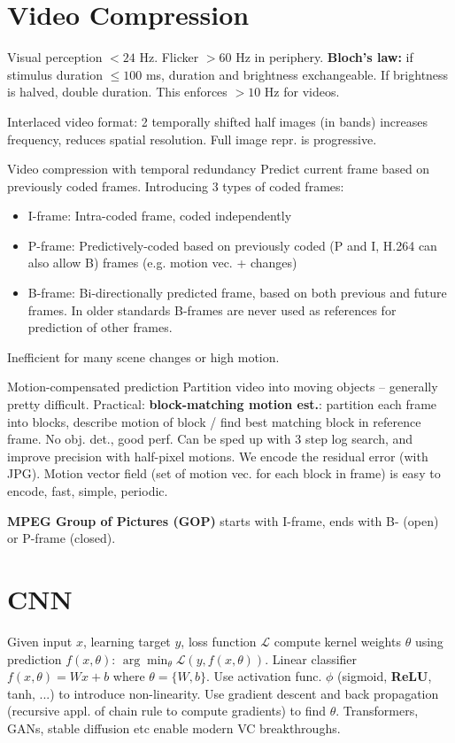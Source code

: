 \documentclass[a4paper,9pt]{article}
\begin{document}
\section{Video Compression}
Visual perception $<24$ Hz. Flicker $>60$ Hz in periphery. \textbf{Bloch's law:} if stimulus duration $\le 100$ ms, duration and brightness exchangeable. If brightness is halved, double duration. This enforces $>10$ Hz for videos.

Interlaced video format: 2 temporally shifted half images (in bands) increases frequency, reduces spatial resolution. Full image repr. is progressive.

\begin{subbox}{Video compression with temporal redundancy}
Predict current frame based on previously coded frames. Introducing 3 types of coded frames:
\begin{itemize}
  \item I-frame: Intra-coded frame, coded independently
  \item P-frame: Predictively-coded based on previously coded (P and I, H.264 can also allow B) frames (e.g. motion vec. + changes)
  \item B-frame: Bi-directionally predicted frame, based on both previous and future frames. In older standards B-frames are never used as references for prediction of other frames.
\end{itemize}
\end{subbox}
Inefficient for many scene changes or high motion.

\begin{subbox}{Motion-compensated prediction}
Partition video into moving objects -- generally pretty difficult. Practical: \textbf{block-matching motion est.}: partition each frame into blocks, describe motion of block / find best matching block in reference frame. No obj. det., good perf. Can be sped up with 3 step log search, and improve precision with half-pixel motions. We encode the residual error (with JPG). Motion vector field (set of motion vec. for each block in frame) is easy to encode, fast, simple, periodic.
\end{subbox}
\textbf{MPEG Group of Pictures (GOP)} starts with I-frame, ends with B- (open) or P-frame (closed).

\section{CNN}
Given input $x$, learning target $y$, loss function $\mathcal{L}$ compute kernel weights $\theta$ using prediction $f(x, \theta)$: $\arg\min_{\theta} \mathcal{L}(y, f(x, \theta))$. Linear classifier $f(x, \theta) = W x + b$ where $\theta = \{W, b\}$. Use activation func. $\phi$ (sigmoid, \textbf{ReLU}, tanh, ...) to introduce non-linearity. Use gradient descent and back propagation (recursive appl. of chain rule to compute gradients) to find $\theta$. Transformers, GANs, stable diffusion etc enable modern VC breakthroughs.
\end{document}
